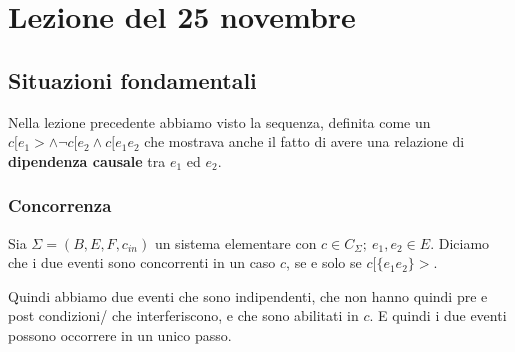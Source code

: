 \section{Lezione del 25 novembre}
\subsection{Situazioni fondamentali}
Nella lezione precedente abbiamo visto la sequenza, definita come un $c[e_1 > \land \neg c[e_2 \land c[e_1e_2$ che mostrava anche il fatto di avere una relazione di \textbf{dipendenza causale} tra $e_1$ ed $e_2$.

\subsubsection{Concorrenza}
Sia $\Sigma = (B,E,F, c_{in})$ un sistema elementare con $c \in C_{\Sigma};\ e_1,e_2 \in E$. Diciamo che i due eventi sono concorrenti in un caso $c$, se e solo se $c[\{e_1e_2\} >$. \\

\begin{center}
\end{center}

Quindi abbiamo due eventi che sono indipendenti, che non hanno quindi pre e post condizioni/ che interferiscono, e che sono abilitati in $c$. E quindi i due eventi possono occorrere in un unico passo.

